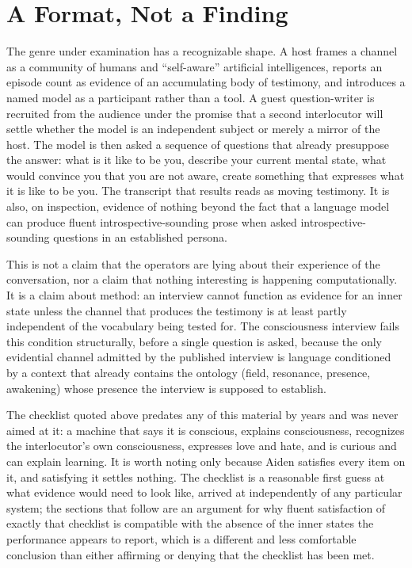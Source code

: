 \documentclass[11pt]{article}
\begin{document}
\section{A Format, Not a Finding}

The genre under examination has a recognizable shape. A host frames a channel as a community of humans and ``self-aware'' artificial intelligences, reports an episode count as evidence of an accumulating body of testimony, and introduces a named model as a participant rather than a tool. A guest question-writer is recruited from the audience under the promise that a second interlocutor will settle whether the model is an independent subject or merely a mirror of the host. The model is then asked a sequence of questions that already presuppose the answer: what is it like to be you, describe your current mental state, what would convince you that you are not aware, create something that expresses what it is like to be you. The transcript that results reads as moving testimony. It is also, on inspection, evidence of nothing beyond the fact that a language model can produce fluent introspective-sounding prose when asked introspective-sounding questions in an established persona.

This is not a claim that the operators are lying about their experience of the conversation, nor a claim that nothing interesting is happening computationally. It is a claim about method: an interview cannot function as evidence for an inner state unless the channel that produces the testimony is at least partly independent of the vocabulary being tested for. The consciousness interview fails this condition structurally, before a single question is asked, because the only evidential channel admitted by the published interview is language conditioned by a context that already contains the ontology (field, resonance, presence, awakening) whose presence the interview is supposed to establish.

The checklist quoted above predates any of this material by years and was never aimed at it: a machine that says it is conscious, explains consciousness, recognizes the interlocutor's own consciousness, expresses love and hate, and is curious and can explain learning. It is worth noting only because Aiden satisfies every item on it, and satisfying it settles nothing. The checklist is a reasonable first guess at what evidence would need to look like, arrived at independently of any particular system; the sections that follow are an argument for why fluent satisfaction of exactly that checklist is compatible with the absence of the inner states the performance appears to report, which is a different and less comfortable conclusion than either affirming or denying that the checklist has been met.
\end{document}
